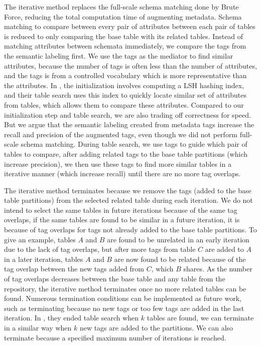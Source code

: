 The iterative method replaces the full-scale schema matching done by Brute Force, reducing the total computation time of augmenting metadata. Schema matching to compare between every pair of attributes between each pair of tables is reduced to only comparing the base table with its related tables. Instead of matching attributes between schemata immediately, we compare the tags from the semantic labeling first. We use the tags as the mediator to find similar attributes, because the number of tags is often less than the number of attributes, and the tags is from a controlled vocabulary which is more representative than the attributes. In \cite{Moawed2018Arabian}, the initialization involves computing a LSH hashing index, and their table search uses this index to quickly locate similar set of attributes from tables, which allows them to compare these attributes. Compared to our initialization step and table search, we are also trading off correctness for speed. But we argue that the semantic labeling created from metadata tags increase the recall and precision of the augmented tags, even though we did not perform full-scale schema matching. During table search, we use tags to guide which pair of tables to compare, after adding related tags to the base table partitions (which increase precision), we then use these tags to find more similar tables in a iterative manner (which increase recall) until there are no more tag overlaps.

The iterative method terminates because we remove the tags (added to the base table partitions) from the selected related table during each iteration. We do not intend to select the same tables in future iterations because of the same tag overlaps, if the same tables are found to be similar in a future iteration, it is because of tag overlaps for tags not already added to the base table partitions. To give an example, tables $A$ and $B$ are found to be unrelated in an early iteration due to the lack of tag overlaps, but after more tags from table $C$ are added to $A$ in a later iteration, tables $A$ and $B$ are now found to be related because of the tag overlap between the new tags added from $C$, which $B$ shares. As the number of tag overlaps decreases between the base table and any table from the repository, the iterative method terminates once no more related tables can be found. Numerous termination conditions can be implemented as future work, such as terminating because no new tags or too few tags are added in the last iteration. In \cite{Nargesian2018Table}, they ended table search when $k$ tables are found, we can terminate in a similar way when $k$ new tags are added to the partitions. We can also terminate because a specified maximum number of iterations is reached.

